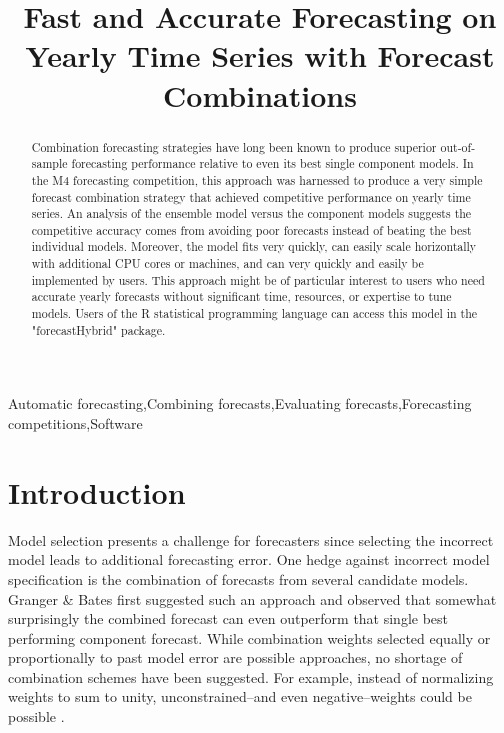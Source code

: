 \documentclass[11pt,3p,review,authoryear]{elsarticle}
\begin{document}
\begin{frontmatter}

\title{Fast and Accurate Forecasting on Yearly Time Series with Forecast Combinations}





\begin{abstract}
Combination forecasting strategies have long been known to produce superior out-of-sample forecasting performance relative to even its best single component models. In the M4 forecasting competition, this approach was harnessed to produce a very simple forecast combination strategy that achieved competitive performance on yearly time series. An analysis of the ensemble model versus the component models suggests the competitive accuracy comes from avoiding poor forecasts instead of beating the best individual models. Moreover, the model fits very quickly, can easily scale horizontally with additional CPU cores or machines, and can very quickly and easily be implemented by users. This approach might be of particular interest to users who need accurate yearly forecasts without significant time, resources, or expertise to tune models. Users of the R statistical programming language can access this model in the "forecastHybrid" package.
\end{abstract}

\begin{keyword}
Automatic forecasting\sep Combining forecasts\sep Evaluating forecasts\sep Forecasting competitions\sep Software
\end{keyword}

\end{frontmatter}


\section{Introduction}
Model selection presents a challenge for forecasters since selecting the incorrect model leads to additional forecasting error. One hedge against incorrect model specification is the combination of forecasts from several candidate models. Granger \& Bates \cite{BatesGranger1969} first suggested such an approach and observed that somewhat surprisingly the combined forecast can even outperform that single best performing component forecast. While combination weights selected equally or proportionally to past model error are possible approaches, no shortage of combination schemes have been suggested. For example, instead of normalizing weights to sum to unity, unconstrained--and even negative--weights could be possible \citep{GrangerRamanathan1984}.
\end{document}
